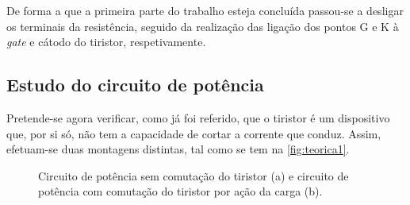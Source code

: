 \documentclass[a4paper,11pt]{article}
\numberwithin{equation}{section}
\begin{document}
De forma a que a primeira parte do trabalho esteja concluída passou-se a desligar os terminais da resistência, seguido da realização das ligação dos pontos G e K à \textit{gate} e cátodo do tiristor, respetivamente.

\subsection{Estudo do circuito de potência}

Pretende-se agora verificar, como já foi referido, que o tiristor é um dispositivo que, por si só, não tem a capacidade de cortar a corrente que conduz. Assim, efetuam-se duas montagens distintas, tal como se tem na \autoref{fig:teorica1}.

\begin{figure}[H]
	\centering
	\hspace{8mm}
	\caption{Circuito de potência sem comutação do tiristor (a) e circuito de potência com comutação do tiristor por ação da carga (b).}
	\label{fig:teorica1}
	\vspace{-0.8em}
\end{figure}
\end{document}
